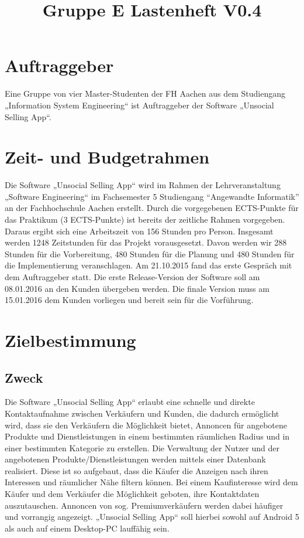 \documentclass[a4paper,12pt,oneside]{scrartcl}
\title{Gruppe E Lastenheft V0.4}
\begin{document}
\maketitle
\newpage
\tableofcontents
\newpage

\section{Auftraggeber}
Eine Gruppe von vier Master-Studenten der FH Aachen aus dem Studiengang „Information System Engineering“ ist Auftraggeber der Software „Unsocial Selling App“. 




\section{Zeit- und Budgetrahmen}
Die Software „Unsocial Selling App“ wird im Rahmen der Lehrveranstaltung „Software Engineering“ im Fachsemester 5 Studiengang “Angewandte Informatik” an der Fachhochschule Aachen erstellt.
Durch die vorgegebenen ECTS-Punkte für das Praktikum (3 ECTS-Punkte) ist bereits der zeitliche Rahmen vorgegeben.
Daraus ergibt sich eine Arbeitszeit von 156 Stunden pro Person. Insgesamt werden 1248 Zeitstunden für das Projekt vorausgesetzt. 
Davon werden wir 288 Stunden für die Vorbereitung, 480 Stunden für die Planung und 480 Stunden für die Implementierung veranschlagen. 
Am 21.10.2015 fand das erste Gespräch mit dem Auftraggeber statt.
Die erste Release-Version der Software soll am 08.01.2016 an den Kunden übergeben werden.
Die finale Version muss am 15.01.2016 dem Kunden vorliegen und bereit sein für die Vorführung. 




\section{Zielbestimmung}
\subsection{Zweck}
Die Software „Unsocial Selling App“ erlaubt eine schnelle und direkte Kontaktaufnahme zwischen Verkäufern und Kunden, die dadurch ermöglicht wird, dass sie den Verkäufern die Möglichkeit bietet, Annoncen für angebotene Produkte und Dienstleistungen in einem bestimmten räumlichen Radius und in einer bestimmten Kategorie zu erstellen.
Die Verwaltung der Nutzer und der angebotenen Produkte/Dienstleistungen werden mittels einer Datenbank realisiert.
Diese ist so aufgebaut, dass die Käufer die Anzeigen nach ihren Interessen und räumlicher Nähe filtern können.
Bei einem Kaufinteresse wird dem Käufer und dem Verkäufer die Möglichkeit geboten, ihre Kontaktdaten auszutauschen.
Annoncen von sog. Premiumverkäufern werden dabei häufiger und vorrangig angezeigt.
„Unsocial Selling App“ soll hierbei sowohl auf Android 5 als auch auf einem Desktop-PC lauffähig sein.
\end{document}
